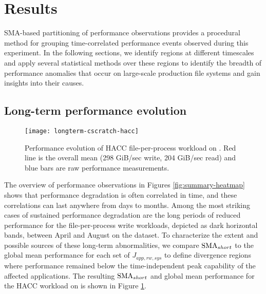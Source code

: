 \section{Results}\label{sec:results}

SMA-based partitioning of performance observations provides a procedural method for grouping time-correlated performance events observed during this experiment.
In the following sections, we identify regions at different timescales and apply several statistical methods over these regions to identify the breadth of performance anomalies that occur on large-scale production file systems and gain insights into their causes.


\subsection{Long-term performance evolution} \label{sec:results/longterm}

\begin{figure}[t]
    \centering
    \texttt{[image: longterm-cscratch-hacc]}
    \vspace{-.35in}
    \caption{Performance evolution of HACC file-per-process workload on \cori.  Red line is the overall mean (298 GiB/sec write, 204 GiB/sec read) and blue bars are raw performance measurements.}
    \label{fig:timeseries-baseline}
\end{figure}

The overview of performance observations in Figures \ref{fig:summary-heatmap} shows that performance degradation is often correlated in time, and these correlations can last anywhere from days to months.
Among the most striking cases of sustained performance degradation are the long periods of reduced performance for the file-per-process write workloads, depicted as dark horizontal bands, between April and August on the \cori dataset.
To characterize the extent and possible sources of these long-term abnormalities, we compare $\textup{SMA}_{short}$ to the global mean performance for each set of $J_{app, rw, sys}$ to define divergence regions where performance remained below the time-independent peak capability of the affected applications.
The resulting $\textup{SMA}_{short}$ and global mean performance for the HACC workload on \cori is shown in Figure \ref{fig:timeseries-baseline}.

